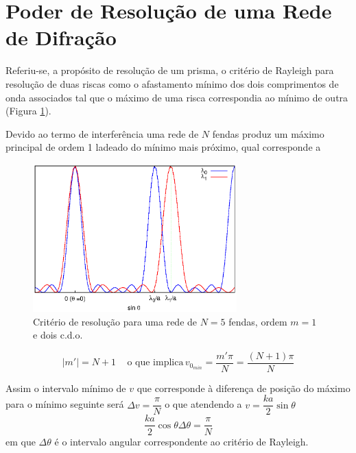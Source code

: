 \documentclass[a4paper,12pt]{article}
\begin{document}

\section{Poder de Resolução de uma Rede de \mbox{Difração}}
Referiu-se, a propósito de resolução de um prisma, o critério de Rayleigh para resolução de duas riscas   como o afastamento mínimo dos dois comprimentos de onda associados  tal que o máximo de uma risca correspondia ao mínimo de outra (Figura \ref{fig:raleigh}). 

Devido ao termo de interferência  uma rede de $N$ fendas produz um máximo principal de ordem 1 ladeado do mínimo mais próximo, qual corresponde a 
 
 \begin{figure}
	[!tb]  \centering 
	\includegraphics[width=0.7\textwidth]{raleigh} 
	\caption{Critério de resolução para uma rede de $N=5$ fendas, ordem $m=1$ e dois c.d.o.
	\label{fig:raleigh}} 
\end{figure}

\begin{equation*}
	|m'| = N + 1 \, \quad  \text{o que implica}  \,  v_{0_{min}}= \frac{m' \pi}{N} =  \frac{(N + 1)\pi}{N}
\end{equation*}

Assim o intervalo mínimo de $v$ que corresponde à diferença de posição do máximo para o mínimo seguinte será $\Delta v=  \dfrac{\pi}{N}$ o que atendendo a $ v = \dfrac{k a }{2} \sin \theta$
\begin{equation} \label{eq:50}
\frac{k a }{2} \cos \theta \Delta \theta = \frac{\pi}{N}
\end{equation}
em que $\Delta \theta$ é o intervalo angular correspondente ao critério de Rayleigh.
\end{document}

